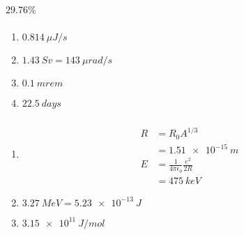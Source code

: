\documentclass{article}
\begin{document}
$29.76\%$

\setcounter{subsubsection}{62}
\subsubsection{}

\begin{enumerate}
  \item $\qty{0.814}{\mu J/s}$

  \item $\qty{1.43}{Sv} = \qty{143}{\mu rad/s}$

  \item $\qty{0.1}{mrem}$

  \item $\qty{22.5}{days}$
\end{enumerate}

\setcounter{subsubsection}{66}
\subsubsection{}

\begin{enumerate}
  \item

        \begin{align*}
          R & = R_0 A^{1 / 3}                              \\
            & = \qty{1.51e-15}{m}                          \\
          E & = \frac{1}{4 \pi \epsilon_0} \frac{e^2}{2 R} \\
            & = \qty{475}{keV}
        \end{align*}

  \item $\qty{3.27}{MeV} = \qty{5.23e-13}{J}$

  \item $\qty{3.15e11}{J/mol}$
\end{enumerate}

\setcounter{subsubsection}{68}
\subsubsection{}
\end{document}
